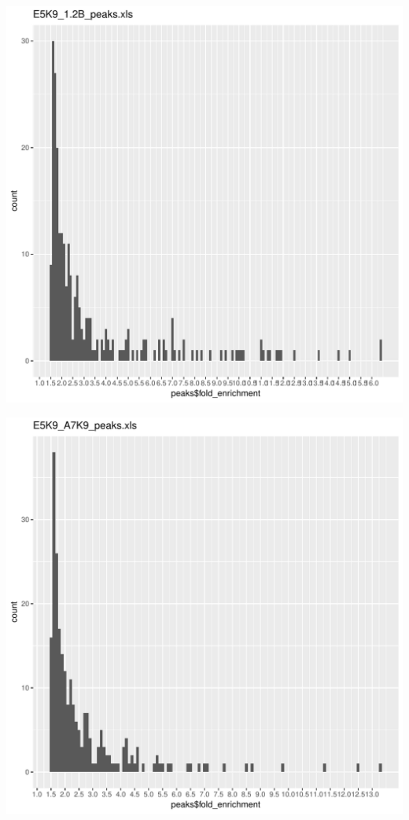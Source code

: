 \documentclass{article}\usepackage[]{graphicx}\usepackage[]{color}
\makeatletter
\def\maxwidth{ %
  \ifdim\Gin@nat@width>\linewidth
    \linewidth
  \else
    \Gin@nat@width
  \fi
}
\newenvironment{knitrout}{}{} %
\makeatother
\begin{document}
\begin{knitrout}
\includegraphics[width=\maxwidth]{figure/unnamed-chunk-2-20} 

\includegraphics[width=\maxwidth]{figure/unnamed-chunk-2-21} 


\end{knitrout}
\end{document}
